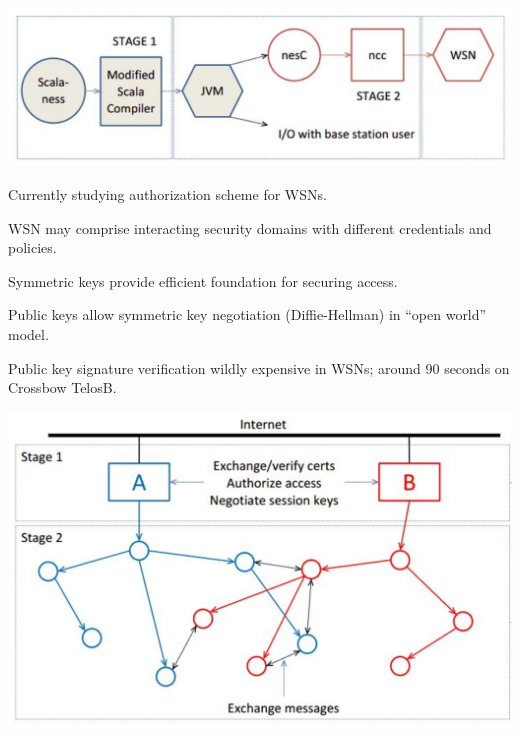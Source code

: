 

\hspace*{.6in}\includegraphics{scalaness}

\stopslide


Currently studying authorization scheme for WSNs.
\begin{citemize}
\item WSN may comprise interacting security domains with different credentials
and policies.
\item Symmetric keys provide efficient foundation for securing access.
\item Public keys allow symmetric key negotiation (Diffie-Hellman) in ``open world''
model.
\end{citemize}
Public key signature verification wildly expensive in WSNs; around 90 seconds
on Crossbow TelosB.

\stopslide
%
%


\hspace*{.6in}\includegraphics{spartanrpc}

